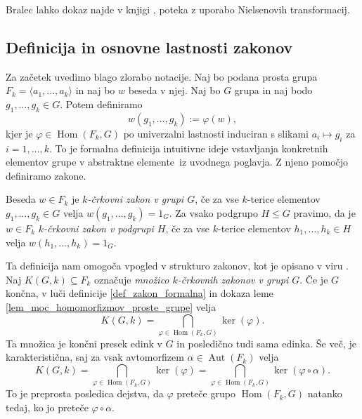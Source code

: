 Bralec lahko dokaz najde v knjigi \cite[str.~5--8]{Lyndon_Schupp_2015}, poteka z uporabo Nielsenovih transformacij.

\subsection{Definicija in osnovne lastnosti zakonov}\label{sec_osnovne_lastnosti_zakonov}

Za začetek uvedimo blago zlorabo notacije. Naj bo podana prosta grupa $F_k = \langle a_1, \ldots, a_k \rangle$ in naj bo $w$ beseda v njej.
Naj bo $G$ grupa in naj bodo $g_1, \ldots, g_k \in G$. Potem definiramo \begin{equation*}
    w(g_1, \ldots, g_k) := \varphi(w),
\end{equation*}
kjer je $\varphi \in \operatorname{Hom}(F_k, G)$ po univerzalni lastnosti induciran s slikami $a_i \mapsto g_i$ za $i = 1, \ldots, k$.
To je formalna definicija intuitivne ideje \glqq vstavljanja konkretnih elementov grupe v abstraktne elemente\grqq~iz uvodnega poglavja. Z njeno pomočjo definiramo zakone.

\begin{definicija}\label{def_zakon_formalna}
    Beseda $w \in F_k$ je \emph{$k$-črkovni zakon v grupi $G$}, če za vse $k$-terice elementov $g_1, \ldots, g_k \in G$ velja $w(g_1, \ldots, g_k) = 1_G$.
    Za vsako podgrupo $H \le G$ pravimo, da je $w \in F_k$ \emph{$k$-črkovni zakon v podgrupi $H$}, če za vse $k$-terice elementov $h_1, \ldots, h_k \in H$ velja $w(h_1, \ldots, h_k) = 1_G$.
\end{definicija}

Ta definicija nam omogoča vpogled v strukturo zakonov, kot je opisano v viru \cite{Schneider_2016}. Naj $K(G, k) \subseteq F_k$ označuje \emph{množico $k$-črkovnih zakonov v grupi $G$}. Če je $G$ končna, v luči definicije \ref{def_zakon_formalna} in dokaza leme \ref{lem_moc_homomorfizmov_proste_grupe} velja
\begin{equation*}
K(G, k)  = \bigcap_{\varphi \in \operatorname{Hom}(F_k, G)} \ker(\varphi).   
\end{equation*}  
Ta množica je končni presek edink v $G$ in posledično tudi sama edinka. Še več, je karakteristična, saj za vsak avtomorfizem $\alpha \in \operatorname{Aut}(F_k)$ velja
\begin{equation*}
    K(G, k)  = \bigcap_{\varphi \in \operatorname{Hom}(F_k, G)} \ker(\varphi) = \bigcap_{\varphi \in \operatorname{Hom}(F_k, G)} \ker(\varphi \circ \alpha). 
\end{equation*}  
To je preprosta posledica dejstva, da $\varphi$ preteče grupo $\operatorname{Hom}(F_k, G)$ natanko tedaj, ko jo preteče $\varphi \circ \alpha$.     

